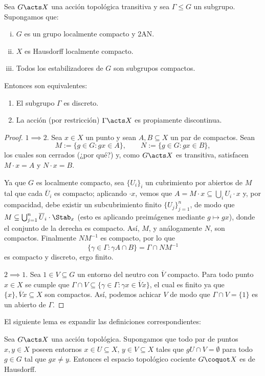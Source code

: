 \documentclass[teoria-numeros.tex]{subfiles}
\begin{document}
\begin{thm}\label{thm:proper_discont_action}
	Sea $G \acts X$ una acción topológica transitiva y sea $\Gamma \le G$ un subgrupo.
	Supongamos que:
	\begin{enumerate}[(i)]
		\item $G$ es un grupo localmente compacto y 2AN.
		\item $X$ es Hausdorff localmente compacto.
		\item Todos los estabilizadores de $G$ son subgrupos compactos.
	\end{enumerate}
	Entonces son equivalentes:
	\begin{enumerate}
		\item El subgrupo $\Gamma$ es discreto.
		\item La acción (por restricción) $\Gamma \acts X$ es propiamente discontinua.
	\end{enumerate}
\end{thm}
\begin{proof}
	$1 \implies 2$.
	Sea $x \in X$ un punto y sean $A, B \subseteq X$ un par de compactos.
	Sean
	\[
		M := \{ g \in G : gx \in A \}, \qquad N := \{ g \in G : gx \in B \},
	\]
	los cuales son cerrados (¿por qué?) y, como $G \acts X$ es transitiva, satisfacen $M\cdot x = A$ y $N\cdot x = B$.

	Ya que $G$ es localmente compacto, sea $\{ U_i \}_i$ un cubrimiento por abiertos de $M$ tal que cada $\overline{U}_i$ es compacto;
	aplicando ${\cdot x}$, vemos que $A = M\cdot x \subseteq \bigcup_{i} U_i\cdot x$ y, por compacidad, debe existir un subcubrimiento finito
	$\{ U_j \}_{j=1}^n$, de modo que $M \subseteq \bigcup_{j=1}^n \overline{U}_i\cdot\Stab_x$ (esto es aplicando preimágenes mediante $g \mapsto gx$),
	donde el conjunto de la derecha es compacto.
	Así, $M$, y análogamente $N$, son compactos.
	Finalmente $NM^{-1}$ es compacto, por lo que
	\[
		\{ \gamma \in \Gamma : \gamma A \cap B \} = \Gamma \cap NM^{-1}
	\]
	es compacto y discreto, ergo finito.

	$2 \implies 1$.
	Sea $1 \in V \subseteq G$ un entorno del neutro con $\overline{V}$ compacto.
	Para todo punto $x \in X$ se cumple que $\Gamma \cap V \subseteq \{ \gamma \in \Gamma : \gamma x \in \overline{V}x \}$,
	el cual es finito ya que $\{ x \}, \overline{V}x \subseteq X$ son compactos.
	Así, podemos achicar $V$ de modo que $\Gamma \cap V = \{ 1 \}$ es un abierto de $\Gamma$.
\end{proof}

\addtocounter{thmi}{1}
El siguiente lema es expandir las definiciones correspondientes:
\begin{slem}\label{thm:lemma_for_Haus_quot}
	Sea $G \acts X$ una acción topológica.
	Supongamos que todo par de puntos $x, y \in X$ poseen entornos $x \in U \subseteq X$, $y \in V \subseteq X$ tales que $gU \cap V = \emptyset$
	para todo $g \in G$ tal que $gx \ne y$.
	Entonces el espacio topológico cociente $G \coquot X$ es de Hausdorff.
\end{slem}
\addtocounter{thmi}{-1}
\end{document}
